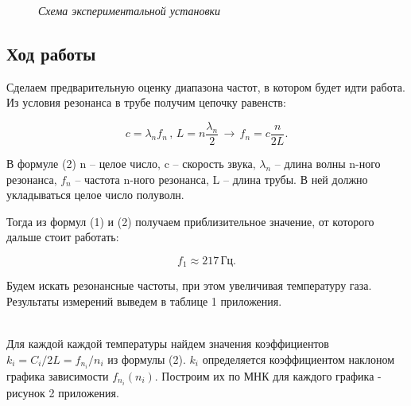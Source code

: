 \documentclass[a4paper, fontsize = 14pt]{article}
\begin{document}
\begin{figure}[h!]
\caption{\textit{Схема экспериментальной установки}}
\end{figure}

\subsection*{Ход работы}

Сделаем предварительную оценку диапазона частот, в котором будет идти работа. Из условия резонанса в трубе получим цепочку равенств:

\begin{equation}
c = \lambda_n f_n \, , \, L = n \frac{\lambda_n}{2} \,  \rightarrow \, f_{n}=c \frac{n}{2L}.
\end{equation}

В формуле (2) n – целое число, c – скорость звука, $\lambda_n$ – длина волны n-ного резонанса, $f_n$ – частота n-ного резонанса, L – длина трубы. В ней должно укладываться целое число полуволн. 

Тогда из формул (1) и (2) получаем приблизительное значение, от которого дальше стоит работать:

\[f_1 \approx 217 \, Гц .\]

Будем искать резонансные частоты, при этом увеличивая температуру газа. Результаты измерений выведем в таблице 1 приложения.

\textbf{ } \\

Для каждой каждой температуры найдем значения коэффициентов $k_i = C_i/2L = f_{n_i} / n_i $ из формулы (2). $k_i$ определяется коэффициентом наклоном графика зависимости $f_{n_i}(n_i)$. Построим их по МНК для каждого графика - рисунок 2 приложения.
\end{document}
